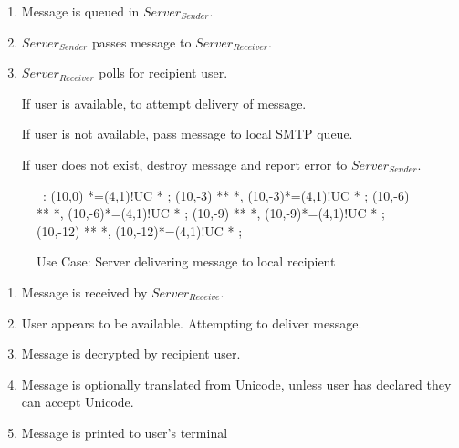 \begin{enumerate}

\item Message is queued in $Server_{Sender}$.

\item $Server_{Sender}$ passes message to $Server_{Receiver}$.

\item $Server_{Receiver}$ polls for recipient user. 

\subitem If user is available, to attempt delivery of message. 

\subitem If user is not available, pass message to local SMTP queue. 

\subitem If user does not exist, destroy message and report error to $Server_{Sender}$.

\end{enumerate}


\begin{figure}[ht]

\small

\begin{center}

\ \xy<1cm,0cm>:
(10,0) *=(4,1)!UC *\frm{-} ;
(10,-3) **\dir{-} *\dir{>},
(10,-3)*=(4,1)!UC *\frm{-} ; 
(10,-6) **\dir{-} *\dir{>},
(10,-6)*=(4,1)!UC *\frm{--} ; 
(10,-9) **\dir{-} *\dir{>},
(10,-9)*=(4,1)!UC *\frm{--} ; 
(10,-12) **\dir{-} *\dir{>},
(10,-12)*=(4,1)!UC *\frm{-} ; 
\endxy

\end{center}

\caption{Use Case: Server delivering message to local recipient}

\end{figure}


\begin{enumerate}

\item Message is received by $Server_{Receive}$.

\item User appears to be available. Attempting to deliver message.

\item Message is decrypted by recipient user. 

\item Message is optionally translated from Unicode, unless user has
declared they can accept Unicode. 

\item Message is printed to user's terminal

\end{enumerate}

\vfill
